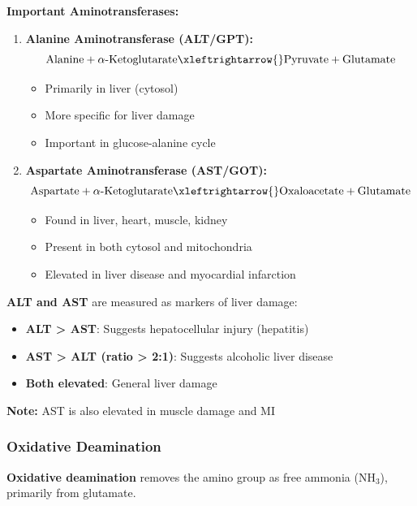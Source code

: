 \textbf{Important Aminotransferases:}

\begin{enumerate}
    \item \textbf{Alanine Aminotransferase (ALT/GPT):}
    \[
    \text{Alanine} + \alpha\text{-Ketoglutarate} \xleftrightarrow{} \text{Pyruvate} + \text{Glutamate}
    \]
    \begin{itemize}
        \item Primarily in liver (cytosol)
        \item More specific for liver damage
        \item Important in glucose-alanine cycle
    \end{itemize}
    
    \item \textbf{Aspartate Aminotransferase (AST/GOT):}
    \[
    \text{Aspartate} + \alpha\text{-Ketoglutarate} \xleftrightarrow{} \text{Oxaloacetate} + \text{Glutamate}
    \]
    \begin{itemize}
        \item Found in liver, heart, muscle, kidney
        \item Present in both cytosol and mitochondria
        \item Elevated in liver disease and myocardial infarction
    \end{itemize}
\end{enumerate}

\begin{tcolorbox}[colback=red!5, colframe=red!70!black, title=\textbf{Clinical Correlation: Liver Function Tests}]
\textbf{ALT and AST} are measured as markers of liver damage:
\begin{itemize}
    \item \textbf{ALT > AST}: Suggests hepatocellular injury (hepatitis)
    \item \textbf{AST > ALT (ratio > 2:1)}: Suggests alcoholic liver disease
    \item \textbf{Both elevated}: General liver damage
\end{itemize}

\textbf{Note:} AST is also elevated in muscle damage and MI
\end{tcolorbox}

\subsubsection{Oxidative Deamination}

\begin{definition}
\textbf{Oxidative deamination} removes the amino group as free ammonia (NH$_3$), primarily from glutamate.
\end{definition}

